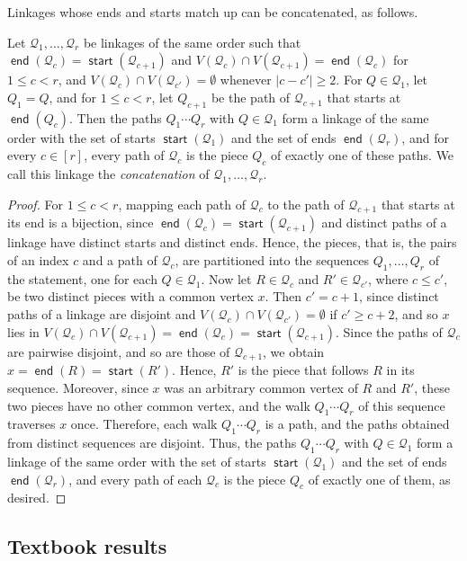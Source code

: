 \documentclass[fontsize=12pt,leading=14pt]{fullpaper}
\DeclareMathOperator{\st}{\mathsf{start}}
\DeclareMathOperator{\en}{\mathsf{end}}
\newcommand{\Qcal}{\mathcal{Q}}
\begin{document}
Linkages whose ends and starts match up can be concatenated, as follows.

\begin{observation}\label{obs:concat}
  Let $\Qcal_1,\dots,\Qcal_r$ be linkages of the same order such that $\en(\Qcal_c)=\st(\Qcal_{c+1})$ and $V(\Qcal_c)\cap V(\Qcal_{c+1})=\en(\Qcal_c)$ for $1\le c<r$, and $V(\Qcal_c)\cap V(\Qcal_{c'})=\emptyset$ whenever $|c-c'|\ge2$.
  For $Q\in\Qcal_1$, let $Q_1=Q$, and for $1\le c<r$, let $Q_{c+1}$ be the path of $\Qcal_{c+1}$ that starts at $\en(Q_c)$.
  Then the paths $Q_1\cdots Q_r$ with $Q\in\Qcal_1$ form a linkage of the same order with the set of starts $\st(\Qcal_1)$ and the set of ends $\en(\Qcal_r)$, and for every $c\in[r]$, every path of $\Qcal_c$ is the piece $Q_c$ of exactly one of these paths.
  We call this linkage the \emph{concatenation} of $\Qcal_1,\dots,\Qcal_r$.
\end{observation}

\begin{proof}
  For $1\le c<r$, mapping each path of $\Qcal_c$ to the path of $\Qcal_{c+1}$ that starts at its end is a bijection, since $\en(\Qcal_c)=\st(\Qcal_{c+1})$ and distinct paths of a linkage have distinct starts and distinct ends.
  Hence, the pieces, that is, the pairs of an index $c$ and a path of $\Qcal_c$, are partitioned into the sequences $Q_1,\dots,Q_r$ of the statement, one for each $Q\in\Qcal_1$.
  Now let $R\in\Qcal_c$ and $R'\in\Qcal_{c'}$, where $c\le c'$, be two distinct pieces with a common vertex $x$.
  Then $c'=c+1$, since distinct paths of a linkage are disjoint and $V(\Qcal_c)\cap V(\Qcal_{c'})=\emptyset$ if $c'\ge c+2$, and so $x$ lies in $V(\Qcal_c)\cap V(\Qcal_{c+1})=\en(\Qcal_c)=\st(\Qcal_{c+1})$.
  Since the paths of $\Qcal_c$ are pairwise disjoint, and so are those of $\Qcal_{c+1}$, we obtain $x=\en(R)=\st(R')$.
  Hence, $R'$ is the piece that follows $R$ in its sequence.
  Moreover, since $x$ was an arbitrary common vertex of $R$ and $R'$, these two pieces have no other common vertex, and the walk $Q_1\cdots Q_r$ of this sequence traverses $x$ once.
  Therefore, each walk $Q_1\cdots Q_r$ is a path, and the paths obtained from distinct sequences are disjoint.
  Thus, the paths $Q_1\cdots Q_r$ with $Q\in\Qcal_1$ form a linkage of the same order with the set of starts $\st(\Qcal_1)$ and the set of ends $\en(\Qcal_r)$, and every path of each $\Qcal_c$ is the piece $Q_c$ of exactly one of them, as desired.
\end{proof}
\subsection{Textbook results}\label{sec:prelim-textbook}
\end{document}
